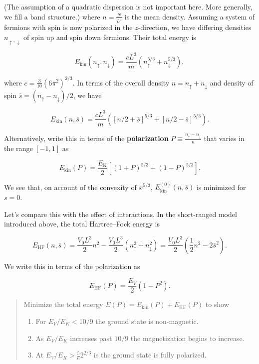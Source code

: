(The assumption of a quadratic dispersion is not important here. More
generally, we fill a band structure.) where \(n = \frac{N}{L^3}\) is the
mean density. Assuming a system of fermions with spin is now polarized
in the \(z\)-direction, we have differing densities
\(n_{\uparrow,\downarrow}\) of spin up and spin down fermions. Their
total energy is

\[
E_\text{kin}(n_\uparrow,n_\downarrow) = \frac{cL^3}{m}\left(n_\uparrow^{5/3}+n_\downarrow^{5/3}\right),
\]

where \(c=\frac{3}{10}(6\pi^2)^{2/3}\). In terms of the overall density
\(n=n_\uparrow+n_\downarrow\) and density of spin
\(\bar s = \left(n_\uparrow-n_\downarrow\right)/2\), we have

\[
E_\text{kin}(n, \bar s) = \frac{cL^3}{m}\left(\left[n/2+\bar s\right]^{5/3}+\left[n/2-\bar s\right]^{5/3}\right).
\]

Alternatively, write this in terms of the \textbf{polarization}
\(P \equiv \frac{n_\uparrow-n_\downarrow}{n}\) that varies in the range
\([-1,1]\) as

\[
E_\text{kin}(P) = \frac{E_\text{K}}{2}\left[(1+P)^{5/3}+(1-P)^{5/3}\right].
\]

We see that, on account of the convexity of \(x^{5/3}\),
\(E^{(0)}_\text{kin}(n, \bar s)\) is minimized for \(s=0\).

Let's compare this with the effect of interactions. In the short-ranged
model introduced above, the total Hartree--Fock energy is

\[
E_\text{HF}(n,\bar s) = \frac{V_0L^3}{2} n^2 - \frac{V_0L^3}{2} \left(n_\uparrow^2+n_\downarrow^2\right) =  \frac{V_0L^3}{2} \left(\frac{1}{2}n^2 - 2\bar s^2\right).
\]

We write this in terms of the polarization as

\[
E_\text{HF}(P) = \frac{E_V}{2}(1-P^2).
\]

\begin{quote}
Minimize the total energy \(E(P) = E_\text{kin}(P) + E_\text{HF}(P)\) to
show

\begin{enumerate}
\def\labelenumi{\arabic{enumi}.}
\tightlist
\item
  For \(E_V/E_K<10/9\) the ground state is non-magnetic.
\item
  As \(E_V/E_K\) increases past \(10/9\) the magnetization begins to
  increase.
\item
  At \(E_V/E_K>\frac{5}{6}2^{2/3}\) is the ground state is fully
  polarized.
\end{enumerate}
\end{quote}

